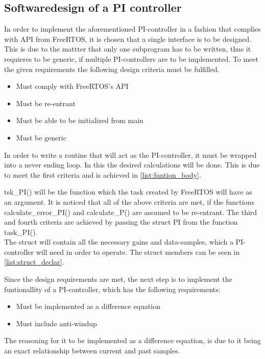 \documentclass[../../../main]{subfiles}
\begin{document}
\subsection{Softwaredesign of a PI controller}
In order to implement the aforementioned PI-controller in a fashion that complies with API from FreeRTOS, it is chosen that a single interface is to be designed.
This is due to the mattter that only one subprogram has to be written, thus it requieres to be generic, if multiple PI-controllers are to be implemented.
To meet the given requirements the following design criteria must be fulfilled.

\begin{itemize}

  \item Must comply with FreeRTOS's API
  \item Must be re-entrant
  \item Must be able to be initialized from main
  \item Must be generic
\end{itemize}

In order to write a routine that will act as the PI-controller, it must be wrapped into a never ending loop.
In this the desired calculations will be done. This is due to meet the first criteria and is achieved in \ref{list:funtion_body}.



tsk\_PI() will be the function which the task created by FreeRTOS will have as an argument.
It is noticed that all of the above criteria are met, if the functions calculate\_error\_PI() and calculate\_P() are assumed to be re-entrant.
The third and fourth criteria are achieved by passing the struct PI from the function task\_PI().
\\

The struct will contain all the necessary gains and data-samples, which a PI-controller will need in order to operate.
The struct members can be seen in \ref{list:struct_declar}.


\newpage
Since the design requirements are met, the next step is to implement the funtionallity of a PI-controller, which has the following requirements:
\begin{itemize}
    \item Must be implemented as a difference equation
    \item Must include anti-windup
\end{itemize}
The reasoning for it to be implemented as a difference equation, is due to it being an exact relationship between current and past samples.
\end{document}
